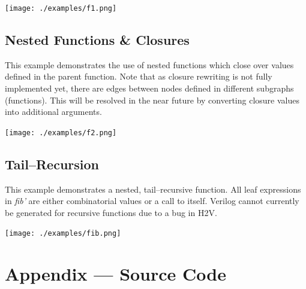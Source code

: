 \documentclass[english,onecolumn]{article}
\begin{document}

\texttt{[image: ./examples/f1.png]}


\subsection{Nested Functions \& Closures}
This example demonstrates the use of nested functions which close over values defined in the parent function.
Note that as closure rewriting is not fully implemented yet, there are edges between nodes defined in different subgraphs (functions).
This will be resolved in the near future by converting closure values into additional arguments.


\texttt{[image: ./examples/f2.png]}


\subsection{Tail--Recursion}
This example demonstrates a nested, tail--recursive function.
All leaf expressions in \textit{fib'} are either combinatorial values or a call to itself.
Verilog cannot currently be generated for recursive functions due to a bug in H2V.


\texttt{[image: ./examples/fib.png]}

\section{Appendix --- Source Code}








\printbibliography
\end{document}
